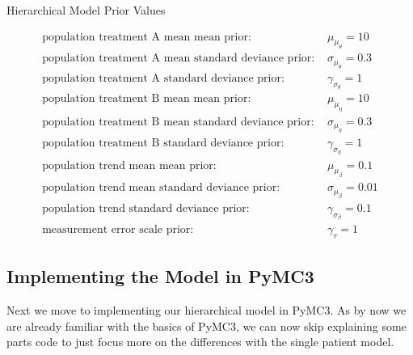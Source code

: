 \documentclass[12pt,a4paper,leqno]{report}
\theoremstyle{plain}
\theoremstyle{definition}
\theoremstyle{remark}
\begin{document}
\begin{table}[H]
    \caption{Hierarchical Model Prior Values}\label{hierarchicalmodelpriorvalues}
    \begin{align}\label{}
        \text{population treatment A mean mean prior: } & \mu_{\mu_{\theta}} = 10 \nonumber \\
        \text{population treatment A mean standard deviance prior: } & \sigma_{\mu_{\theta}} = 0.3 \nonumber \\
        \text{population treatment A standard deviance prior: } & \gamma_{\sigma_{\theta}} = 1 \nonumber \\
        \text{population treatment B mean mean prior: } & \mu_{\mu_{\eta}} = 10 \nonumber \\
        \text{population treatment B mean standard deviance prior: } & \sigma_{\mu_{\eta}} = 0.3 \nonumber \\
        \text{population treatment B standard deviance prior: } & \gamma_{\sigma_{\eta}} = 1 \nonumber \\
        \text{population trend mean mean prior: } & \mu_{\mu_{\beta}} = 0.1 \nonumber \\
        \text{population trend mean standard deviance prior: } & \sigma_{\mu_{\beta}} = 0.01 \nonumber \\
        \text{population trend standard deviance prior: } & \gamma_{\sigma_{\beta}} = 0.1 \nonumber \\
        \text{measurement error scale prior: } & \gamma_{\tau} = 1 \nonumber
    \end{align}
\end{table}


\subsection{Implementing the Model in PyMC3}

Next we move to implementing our hierarchical model in PyMC3. As by now we are already
familiar with the basics of PyMC3, we can now skip explaining some parts code to just focus
more on the differences with the single patient model.
\end{document}
